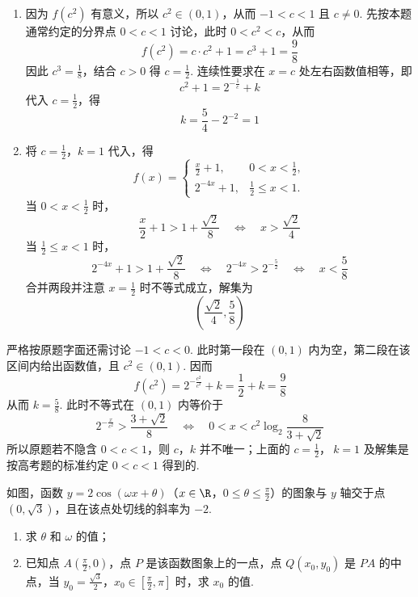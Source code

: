 \begin{solution}
\begin{enumerate}
\item 因为 \(f(c^2)\) 有意义，所以 \(c^2\in(0,1)\)，从而 \(-1<c<1\) 且 \(c\ne0\). 先按本题通常约定的分界点 \(0<c<1\) 讨论，此时 \(0<c^2<c\)，从而
\[
f(c^2)=c\cdot c^2+1=c^3+1=\frac98
\]
因此 \(c^3=\frac18\)，结合 \(c>0\) 得 \(c=\frac12\). 连续性要求在 \(x=c\) 处左右函数值相等，即
\[
c^2+1=2^{-\frac{1}{c}}+k
\]
代入 \(c=\frac12\)，得
\[
k=\frac54-2^{-2}=1
\]

\item 将 \(c=\frac12\)，\(k=1\) 代入，得
\[
f(x)=\begin{cases}
\frac{x}{2}+1, & 0<x<\frac12,\\
2^{-4x}+1, & \frac12\leqslant x<1.
\end{cases}
\]
当 \(0<x<\frac12\) 时，
\[
\frac{x}{2}+1>1+\frac{\sqrt2}{8}\quad\Longleftrightarrow\quad x>\frac{\sqrt2}{4}
\]
当 \(\frac12\leqslant x<1\) 时，
\[
2^{-4x}+1>1+\frac{\sqrt2}{8}
\quad\Longleftrightarrow\quad
2^{-4x}>2^{-\frac{5}{2}}
\quad\Longleftrightarrow\quad
x<\frac58
\]
合并两段并注意 \(x=\frac12\) 时不等式成立，解集为
\[
\left(\frac{\sqrt2}{4},\frac58\right)
\]
\end{enumerate}

严格按原题字面还需讨论 \(-1<c<0\). 此时第一段在 \((0,1)\) 内为空，第二段在该区间内给出函数值，且 \(c^2\in(0,1)\). 因而
\[
f(c^2)=2^{-\frac{c^2}{c^2}}+k=\frac12+k=\frac98
\]
从而 \(k=\frac58\). 此时不等式在 \((0,1)\) 内等价于
\[
2^{-\frac{x}{c^2}}>\frac{3+\sqrt2}{8}
\quad\Longleftrightarrow\quad
0<x<c^2\log_2\frac{8}{3+\sqrt2}
\]
所以原题若不隐含 \(0<c<1\)，则 \(c\)，\(k\) 并不唯一；上面的 \(c=\frac12\)，\(\ k=1\) 及解集是按高考题的标准约定 \(0<c<1\) 得到的.
\end{solution}

\begin{problem}
如图，函数 \(y = 2\cos(\omega x + \theta)\)（\(x \in \R\)，\(0 \leqslant \theta \leqslant \frac{\pi}{2}\)）的图象与 \(y\) 轴交于点 \((0, \sqrt{3})\)，且在该点处切线的斜率为 \(-2\).

\begin{enumerate}
\item 求 \(\theta\) 和 \(\omega\) 的值；
\item 已知点 \(A\left(\frac{\pi}{2}, 0\right)\)，点 \(P\) 是该函数图象上的一点，点 \(Q(x_0, y_0)\) 是 \(PA\) 的中点，当 \(y_0 = \frac{\sqrt{3}}{2}\)，\(x_0 \in \left[\frac{\pi}{2}, \pi\right]\) 时，求 \(x_0\) 的值.
\end{enumerate}

\end{problem}

